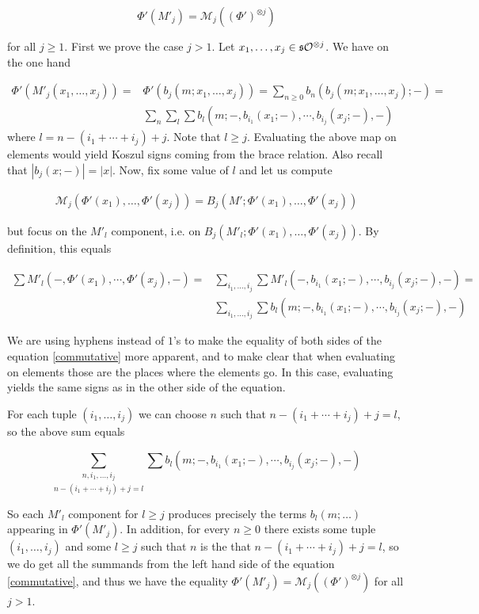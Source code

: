 \documentclass[twoside]{article}
\begin{document}
\begin{equation}\label{commutative}
\Phi'(M'_j)=\mathcal{M}_j((\Phi')^{\otimes j})
\end{equation}

for all $j\geq 1$. First we prove the case $j>1$. Let $x_1,\dots, x_j\in \mathfrak{s}{\mathcal O}^{\otimes j}$. We have on the one hand



\begin{align*}
\Phi'(M'_j(x_1,\dots, x_j))=&\Phi'(b_j(m;x_1,\dots, x_j))=\sum_{n\geq 0} b_n(b_j(m;x_1,\dots, x_j);-)=\\
&\sum_n\sum_l\sum b_l(m; -, b_{i_1}(x_1;-),\cdots,b_{i_j}(x_j;-),-)
\end{align*}
where $l=n-(i_1+\cdots+i_j)+j$. Note that $l\geq j$. Evaluating the above map on elements would yield Koszul signs coming from the brace relation. Also recall that $|b_j(x;-)|=|x|$. Now, fix some value of $l$ and let us compute

\begin{align*}
\mathcal{M}_j(\Phi'(x_1),\dots, \Phi'(x_j))=B_j(M';\Phi'(x_1),\dots, \Phi'(x_j))
\end{align*}

but focus on the $M'_l$ component, i.e. on $B_j(M'_l;\Phi'(x_1),\dots, \Phi'(x_j))$. By definition, this equals

\begin{align*}
\sum M'_l(-,\Phi'(x_1),\cdots, \Phi'(x_j),-)=&\sum_{i_1,\dots, i_j}\sum M'_l(-,b_{i_1}(x_1;-),\cdots,b_{i_j}(x_j;-),-)=\\
&\sum_{i_1,\dots, i_j}\sum b_l(m;-,b_{i_1}(x_1;-),\cdots,b_{i_j}(x_j;-),-)
\end{align*}

We are using hyphens instead of $1$'s to make the equality of both sides of the equation \ref{commutative} more apparent, and to make clear that when evaluating on elements those are the places where the elements go. In this case, evaluating yields the same signs as in the other side of the equation. 

For each tuple $(i_1,\dots, i_j)$ we can choose $n$ such that $n-(i_1+\cdots+i_j)+j=l$, so the above sum equals

$$\underset{n-(i_1+\cdots+i_j)+j=l}{\sum_{n,i_1,\dots, i_j}}\sum b_l(m;-,b_{i_1}(x_1;-),\cdots,b_{i_j}(x_j;-),-)$$

So each $M'_l$ component for $l\geq j$ produces precisely the terms $b_l(m;\dots)$ appearing in $\Phi'(M'_j)$. In addition, for every $n\geq 0$ there exists some tuple $(i_1,\dots, i_j)$ and some $l\geq j$ such that $n$ is the that $n-(i_1+\cdots+i_j)+j=l$, so we do get all the summands from the left hand side of the equation \ref{commutative}, and thus we have the equality $\Phi'(M'_j)=\mathcal{M}_j((\Phi')^{\otimes j})$ for all $j>1$.
\end{document}
